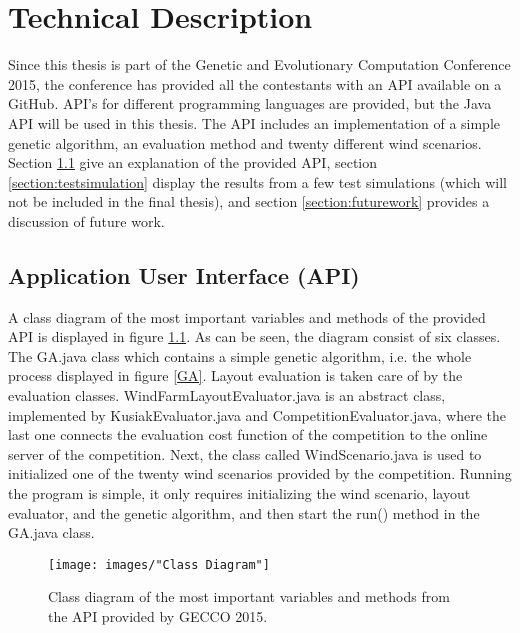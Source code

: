 \chapter{Technical Description}\label{chapter:technical}


Since this thesis is part of the Genetic and Evolutionary Computation Conference 2015, the conference has provided all the contestants with an API available on a GitHub. API's for different programming languages are provided, but the Java API will be used in this thesis. The API includes an implementation of a simple genetic algorithm, an evaluation method and twenty different wind scenarios. Section \ref{section:api} give an explanation of the provided API, section \ref{section:testsimulation} display the results from a few test simulations (which will not be included in the final thesis), and section \ref{section:futurework} provides a discussion of future work.


\section{Application User Interface (API)}\label{section:api}
A class diagram of the most important variables and methods of the provided API is displayed in figure \ref{Class Diagram}. As can be seen, the diagram consist of six classes. The GA.java class which contains a simple genetic algorithm, i.e. the whole process displayed in figure \ref{GA}. Layout evaluation is taken care of by the evaluation classes. WindFarmLayoutEvaluator.java is an abstract class, implemented by KusiakEvaluator.java and CompetitionEvaluator.java, where the last one connects the evaluation cost function of the competition to the online server of the competition. Next, the class called WindScenario.java is used to initialized one of the twenty wind scenarios provided by the competition. Running the program is simple, it only requires initializing the wind scenario, layout evaluator, and the genetic algorithm, and then start the run() method in the GA.java class.


\begin{figure}[h!]
\begin{center}
\texttt{[image: images/"Class Diagram"]}
\caption{Class diagram of the most important variables and methods from the API provided by GECCO 2015.}
\label{Class Diagram}
\end{center}
\end{figure}


